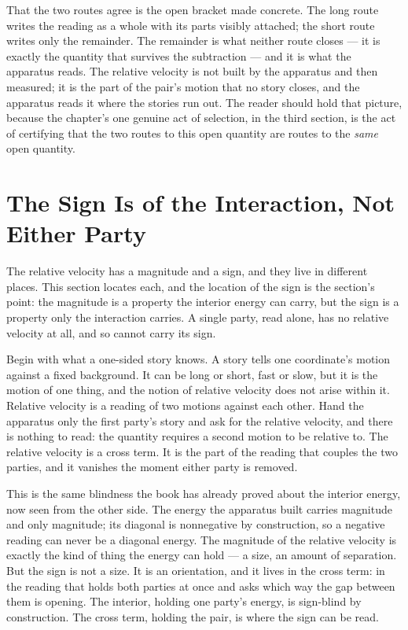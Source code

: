 That the two routes agree is the open bracket made concrete. The long route writes the reading
as a whole with its parts visibly attached; the short route writes only the remainder. The
remainder is what neither route closes --- it is exactly the quantity that survives the
subtraction --- and it is what the apparatus reads. The relative velocity is not built by the
apparatus and then measured; it is the part of the pair's motion that no story closes, and the
apparatus reads it where the stories run out. The reader should hold that picture, because the
chapter's one genuine act of selection, in the third section, is the act of certifying that the
two routes to this open quantity are routes to the \emph{same} open quantity.

\section{The Sign Is of the Interaction, Not Either Party}

The relative velocity has a magnitude and a sign, and they live in different places. This
section locates each, and the location of the sign is the section's point: the magnitude is a
property the interior energy can carry, but the sign is a property only the interaction carries.
A single party, read alone, has no relative velocity at all, and so cannot carry its sign.

Begin with what a one-sided story knows. A story tells one coordinate's motion against a fixed
background. It can be long or short, fast or slow, but it is the motion of one thing, and the
notion of relative velocity does not arise within it. Relative velocity is a reading of two
motions against each other. Hand the apparatus only the first party's story and ask for the
relative velocity, and there is nothing to read: the quantity requires a second motion to be
relative to. The relative velocity is a cross term. It is the part of the reading that couples
the two parties, and it vanishes the moment either party is removed.

This is the same blindness the book has already proved about the interior energy, now seen from
the other side. The energy the apparatus built carries magnitude and only magnitude; its
diagonal is nonnegative by construction, so a negative reading can never be a diagonal energy.
The magnitude of the relative velocity is exactly the kind of thing the energy can hold --- a
size, an amount of separation. But the sign is not a size. It is an orientation, and it lives in
the cross term: in the reading that holds both parties at once and asks which way the gap between
them is opening. The interior, holding one party's energy, is sign-blind by construction. The
cross term, holding the pair, is where the sign can be read.

